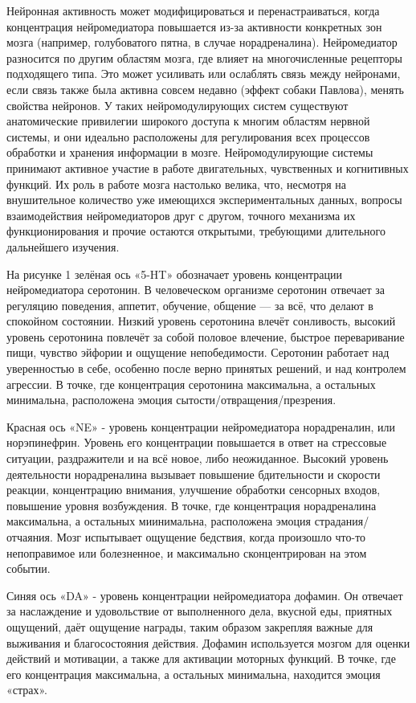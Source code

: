 Нейронная активность может модифицироваться и перенастраиваться, когда концентрация нейромедиатора повышается из-за активности конкретных зон мозга (например, голубоватого пятна, в случае норадреналина). Нейромедиатор разносится по другим областям мозга, где влияет на многочисленные рецепторы подходящего типа. Это может усиливать или ослаблять связь между нейронами, если связь также была активна совсем недавно (эффект собаки Павлова), менять свойства нейронов.\cite{parsingreward} У таких нейромодулирующих систем существуют анатомические привилегии широкого доступа к многим областям нервной системы, и они идеально расположены для регулирования всех процессов обработки и хранения информации в мозге. Нейромодулирующие системы принимают активное участие в работе двигательных, чувственных и когнитивных функций.\cite{zarrindast} Их роль в работе мозга настолько велика, что, несмотря на внушительное количество уже имеющихся экспериментальных данных, вопросы взаимодействия нейромедиаторов друг с другом, точного механизма их функционирования и прочие остаются открытыми, требующими длительного дальнейшего изучения.


На рисунке 1 зелёная ось «5-HT» обозначает уровень концентрации нейромедиатора серотонин. В человеческом организме серотонин отвечает за регуляцию поведения, аппетит, обучение, общение — за всё, что делают в спокойном состоянии. Низкий уровень серотонина влечёт сонливость, высокий уровень серотонина повлечёт за собой половое влечение,  быстрое переваривание пищи, чувство эйфории и ощущение непобедимости. Серотонин работает над уверенностью в себе, особенно после верно принятых решений, и над контролем агрессии. В точке, где концентрация серотонина максимальна, а остальных минимальна, расположена эмоция сытости/отвращения/презрения.


Красная ось «NE» - уровень концентрации нейромедиатора норадреналин, или норэпинефрин. Уровень его концентрации повышается в ответ на стрессовые ситуации, раздражители и на всё новое, либо неожиданное. Высокий уровень деятельности норадреналина вызывает повышение бдительности и скорости реакции, концентрацию внимания, улучшение обработки сенсорных входов, повышение уровня возбуждения. В точке, где концентрация норадреналина максимальна, а остальных миинимальна, расположена эмоция страдания/отчаяния. Мозг испытывает ощущение бедствия, когда произошло что-то непоправимое или болезненное, и максимально сконцентрирован на этом событии.


Синяя ось «DA» - уровень концентрации нейромедиатора дофамин. Он отвечает за наслаждение и удовольствие от выполненного дела, вкусной еды, приятных ощущений, даёт ощущение награды, таким образом закрепляя важные для выживания и благосостояния действия. Дофамин используется мозгом для оценки действий и мотивации, а также для активации моторных функций. В точке, где его концентрация максимальна, а остальных минимальна, находится эмоция «страх».


